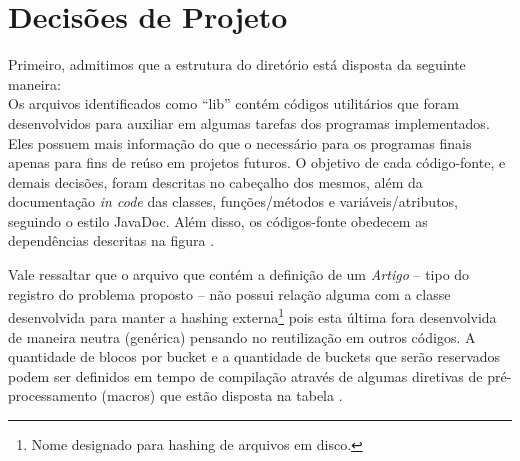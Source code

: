 \section{Decisões de Projeto}\label{sec:decisoes_de_projeto}

Primeiro, admitimos que a estrutura do diretório está disposta da seguinte maneira:
\\


Os arquivos identificados como ``lib'' contém códigos utilitários que foram desenvolvidos para auxiliar em algumas tarefas dos programas implementados. Eles possuem mais informação do que o necessário para os programas finais apenas para fins de reúso em projetos futuros.
O objetivo de cada código-fonte, e demais decisões, foram descritas no cabeçalho dos mesmos, além da documentação \emph{in code} das classes, funções/métodos e variáveis/atributos, seguindo o estilo JavaDoc.
Além disso, os códigos-fonte obedecem as dependências descritas na figura .

Vale ressaltar que o arquivo que contém a definição de um \emph{Artigo} -- tipo do registro do problema proposto -- não possui relação alguma com a classe desenvolvida para manter a hashing externa\footnote{Nome designado para hashing de arquivos em disco.} pois esta última fora desenvolvida de maneira neutra (genérica) pensando no reutilização em outros códigos. A quantidade de blocos por bucket e a quantidade de buckets que serão reservados podem ser definidos em tempo de compilação através de algumas diretivas de pré-processamento (macros) que estão disposta na tabela .



